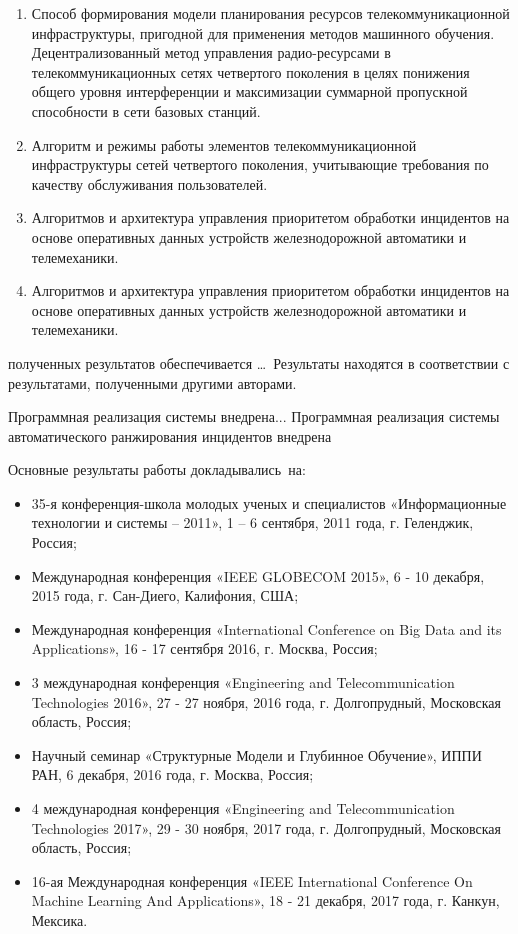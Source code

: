 {}
\begin{enumerate}
  \item Способ формирования модели планирования ресурсов телекоммуникационной инфраструктуры, пригодной для применения методов машинного обучения. Децентрализованный метод управления радио-ресурсами в телекоммуникационных сетях четвертого поколения в целях понижения общего уровня интерференции и максимизации суммарной пропускной способности в сети базовых станций.
  \item Алгоритм и режимы работы элементов телекоммуникационной инфраструктуры сетей четвертого поколения, учитывающие требования по  качеству обслуживания пользователей.
  \item Алгоритмов и архитектура управления приоритетом обработки инцидентов на основе оперативных данных устройств железнодорожной автоматики и телемеханики.
  \item Алгоритмов и архитектура управления приоритетом обработки инцидентов на основе оперативных данных устройств железнодорожной автоматики и телемеханики.
\end{enumerate}

{\reliability} полученных результатов обеспечивается \ldots \ Результаты находятся в соответствии с результатами, полученными другими авторами.



Программная реализация системы  внедрена... 
Программная реализация системы автоматического ранжирования инцидентов внедрена 

{\probation}
Основные результаты работы докладывались~на:
\begin{itemize}
\item 35-я конференция-школа молодых ученых и специалистов «Информационные технологии и системы – 2011», 1 – 6 сентября, 2011 года, г. Геленджик, Россия;
\item Международная конференция «IEEE GLOBECOM 2015», 6 - 10 декабря, 2015 года, г. Сан-Диего, Калифония, США;
\item Международная конференция «International Conference on Big Data and its Applications», 16 - 17 сентября 2016, г. Москва, Россия;
\item 3 международная конференция «Engineering and Telecommunication Technologies 2016», 27 - 27 ноября, 2016 года, г. Долгопрудный, Московская область, Россия;
\item Научный семинар «Структурные Модели и Глубинное Обучение», ИППИ РАН, 6 декабря, 2016 года, г. Москва, Россия;
\item 4 международная конференция «Engineering and Telecommunication Technologies 2017», 29 - 30 ноября, 2017 года, г. Долгопрудный, Московская область, Россия;
\item 16-ая Международная конференция «IEEE International Conference On Machine Learning And Applications», 18 - 21 декабря, 2017 года, г. Канкун, Мексика.
\end{itemize}

